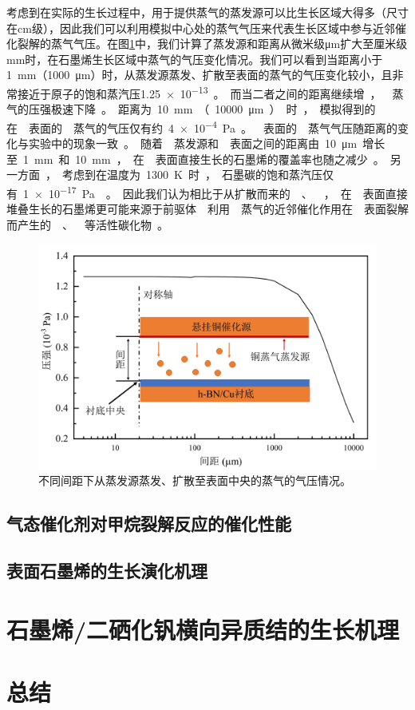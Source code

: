     考虑到在实际的生长过程中，用于提供蒸气的蒸发源可以比生长区域大得多（尺寸在\si{\centi\meter}级），因此我们可以利用模拟中心处的蒸气气压来代表生长区域中参与近邻催化裂解的蒸气气压。在图\ref{fig:CG_FEM_fullCuCenterVariousDistance}中，我们计算了蒸发源和距离从微米级\si{\micro\meter}扩大至厘米级\si{\milli\meter}时，在石墨烯生长区域中蒸气的气压变化情况。我们可以看到当距离小于\SI{1}{\milli\meter}（\SI{1000}{\micro\meter}）时，从蒸发源蒸发、扩散至表面的蒸气的气压变化较小，且非常接近于原子的饱和蒸汽压\SI{1.25e-13}。而当二者之间的距离继续增，蒸气的压强极速下降。距离为\SI{10}{\milli\meter}（\SI{10000}{\micro\meter}）时，模拟得到的在表面的蒸气的气压仅有约\SI{4e-4}{\pascal}。表面的蒸气气压随距离的变化与实验中的现象一致。
    随着蒸发源和表面之间的距离由\SI{10}{\micro\meter}增长至\SI{1}{\milli\meter}和\SI{10}{\milli\meter}，在表面直接生长的石墨烯的覆盖率也随之减少。

    另一方面，考虑到在温度为\SI{1300}{\kelvin}时，石墨碳的饱和蒸汽压仅有\SI{1e-17}{\pascal}。因此我们认为相比于从扩散而来的、，在表面直接堆叠生长的石墨烯更可能来源于前驱体利用蒸气的近邻催化作用在表面裂解而产生的、等活性碳化物。

    \begin{figure}[htb]
        \includegraphics{pic/CG_FEM_fullCuCenterVariousDistance.png}
        \caption{不同间距下从蒸发源蒸发、扩散至表面中央的蒸气的气压情况。}
        \label{fig:CG_FEM_fullCuCenterVariousDistance}
    \end{figure}

    \subsection{气态催化剂对甲烷裂解反应的催化性能}
    \subsection{表面石墨烯的生长演化机理}
\section{石墨烯/二硒化钒横向异质结的生长机理}
\section{总结}